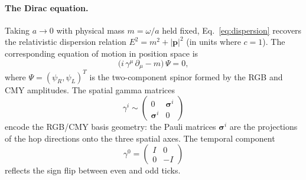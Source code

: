 \paragraph{The Dirac equation.}
Taking $a \to 0$ with physical mass $m = \omega/a$ held fixed,
Eq.~\eqref{eq:dispersion} recovers the relativistic dispersion relation
$E^2 = m^2 + |\mathbf{p}|^2$ (in units where $c = 1$).
The corresponding equation of motion in position space is
\begin{equation}
    \bigl(i\,\gamma^\mu\,\partial_\mu - m\bigr)\,\Psi = 0,
    \label{eq:dirac}
\end{equation}
where $\Psi = (\psi_R, \psi_L)^T$ is the two-component spinor formed by
the RGB and CMY amplitudes.  The spatial gamma matrices
\begin{equation}
    \gamma^i \sim
    \begin{pmatrix} 0 & \boldsymbol{\sigma}^i \\ \boldsymbol{\sigma}^i & 0 \end{pmatrix}
    \label{eq:gamma_spatial}
\end{equation}
encode the RGB/CMY basis geometry: the Pauli matrices $\boldsymbol{\sigma}^i$
are the projections of the hop directions onto the three spatial axes.
The temporal component
\begin{equation}
    \gamma^0 =
    \begin{pmatrix} I & 0 \\ 0 & -I \end{pmatrix}
    \label{eq:gamma_time}
\end{equation}
reflects the sign flip between even and odd ticks.

